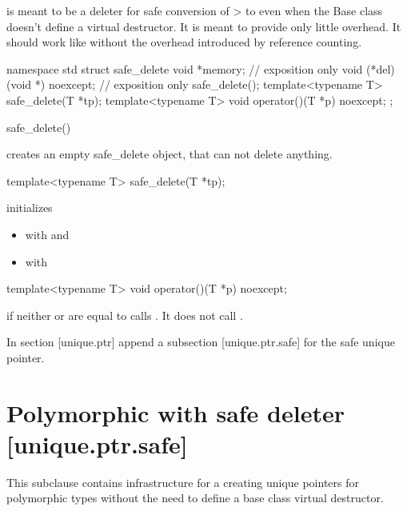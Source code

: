 \documentclass[ebook,11pt,article]{memoir}
\begin{document}
\pnum
\enternote
{} is meant to be a deleter for safe conversion of > to  even when the Base class doesn't define a virtual destructor. It is meant to provide only little overhead. It should work like  without the overhead introduced by reference counting.
\exitnote

\begin{codeblock}
namespace std{
struct safe_delete{
	void *memory; // exposition only
	void (*del)(void *) noexcept; // exposition only
	safe_delete();
	template<typename T>
	safe_delete(T *tp);
	template<typename T>
	void operator()(T *p) noexcept;
};
}
\end{codeblock}

\begin{itemdecl}
safe_delete()
\end{itemdecl}

\pnum
\effects creates an empty safe_delete object, that can not delete anything.
\\

\begin{itemdecl}
template<typename T>
safe_delete(T *tp);
\end{itemdecl}

\pnum
\effects initializes 
\begin{itemize}
\item {} with  and 
\item {} with   
\end{itemize}


\begin{itemdecl}
template<typename T>
void operator()(T *p) noexcept;
\end{itemdecl}

\pnum
\effects if neither  or  are equal to  calls . 
\enternote It does not call .
\exitnote
\\
\pnum

In section [unique.ptr] append a subsection [unique.ptr.safe] for the safe unique pointer.

\section{Polymorphic  with safe deleter [unique.ptr.safe]}
\pnum
This subclause contains infrastructure for a creating unique pointers for polymorphic types without the need to define a base class virtual destructor.\\
\end{document}
